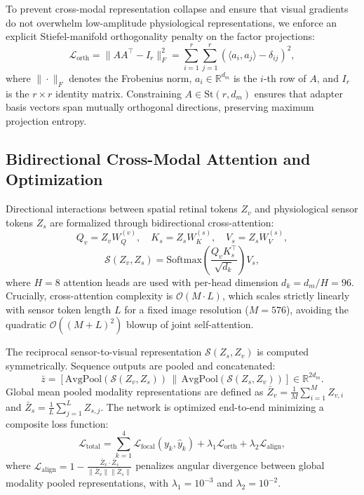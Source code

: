 \documentclass[a4paper,fleqn]{cas-dc}
\begin{document}
To prevent cross-modal representation collapse and ensure that visual gradients do not overwhelm low-amplitude physiological representations, we enforce an explicit Stiefel-manifold orthogonality penalty on the factor projections:
\begin{equation}
    \mathcal{L}_{\text{orth}} = \|A A^\top - I_r\|_F^2 = \sum_{i=1}^r \sum_{j=1}^r (\langle a_i, a_j \rangle - \delta_{ij})^2,
    \label{eq:stiefel_penalty}
\end{equation}
where $\|\cdot\|_F$ denotes the Frobenius norm, $a_i \in \mathbb{R}^{d_m}$ is the $i$-th row of $A$, and $I_r$ is the $r \times r$ identity matrix. Constraining $A \in \text{St}(r, d_m)$ ensures that adapter basis vectors span mutually orthogonal directions, preserving maximum projection entropy.

\subsection{Bidirectional Cross-Modal Attention and Optimization}
\label{sec:cross_attention}
Directional interactions between spatial retinal tokens $Z_v$ and physiological sensor tokens $Z_s$ are formalized through bidirectional cross-attention:
\begin{equation}
    Q_v = Z_v W_Q^{(v)}, \quad K_s = Z_s W_K^{(s)}, \quad V_s = Z_s W_V^{(s)},
\end{equation}
\begin{equation}
    \mathcal{S}(Z_v, Z_s) = \text{Softmax}\left( \frac{Q_v K_s^\top}{\sqrt{d_k}} \right) V_s,
    \label{eq:cross_attn}
\end{equation}
where $H=8$ attention heads are used with per-head dimension $d_k = d_m / H = 96$. Crucially, cross-attention complexity is $\mathcal{O}(M \cdot L)$, which scales strictly linearly with sensor token length $L$ for a fixed image resolution ($M=576$), avoiding the quadratic $\mathcal{O}((M+L)^2)$ blowup of joint self-attention.

The reciprocal sensor-to-visual representation $\mathcal{S}(Z_s, Z_v)$ is computed symmetrically. Sequence outputs are pooled and concatenated:
\begin{equation}
    \bar{z} = \left[ \text{AvgPool}(\mathcal{S}(Z_v, Z_s)) \,\|\, \text{AvgPool}(\mathcal{S}(Z_s, Z_v)) \right] \in \mathbb{R}^{2d_m}.
\end{equation}
Global mean pooled modality representations are defined as $\bar{Z}_v = \frac{1}{M}\sum_{i=1}^M Z_{v, i}$ and $\bar{Z}_s = \frac{1}{L}\sum_{j=1}^L Z_{s, j}$. The network is optimized end-to-end minimizing a composite loss function:
\begin{equation}
    \mathcal{L}_{\text{total}} = \sum_{k=1}^4 \mathcal{L}_{\text{focal}}(y_k, \hat{y}_k) + \lambda_1 \mathcal{L}_{\text{orth}} + \lambda_2 \mathcal{L}_{\text{align}},
    \label{eq:total_loss}
\end{equation}
where $\mathcal{L}_{\text{align}} = 1 - \frac{\bar{Z}_v \cdot \bar{Z}_s}{\|\bar{Z}_v\| \|\bar{Z}_s\|}$ penalizes angular divergence between global modality pooled representations, with $\lambda_1 = 10^{-3}$ and $\lambda_2 = 10^{-2}$.
\end{document}

